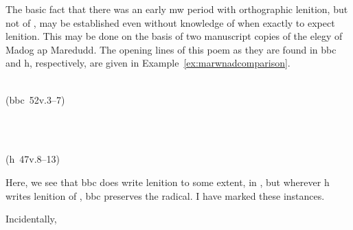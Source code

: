 The basic fact that there was an early \gls{mw} period with orthographic lenition, but not of \lT, may be established even without knowledge of when exactly to expect lenition. This may be done on the basis of two manuscript copies of the elegy of Madog ap Maredudd. The opening lines of this poem as they are found in \gls{bbc}  and \gls{h}, respectively, are given in Example~\ref{ex:marwnadcomparison}.
\begin{mwl}
\item%
  \begin{minipage}{0.45\textwidth}
    \\
    (\acrshort{bbc}~52v.3--7)
  \end{minipage}~
  \begin{minipage}{0.45\textwidth}
    \\
    (\acrshort{h}~47v.8--13)
  \end{minipage}
  \label{ex:marwnadcomparison}
\end{mwl}
Here, we see that \gls{bbc} does write lenition to some extent, \eg in , but wherever \gls{h} writes lenition of , \gls{bbc} preserves the radical. I have marked these instances.

Incidentally, 




